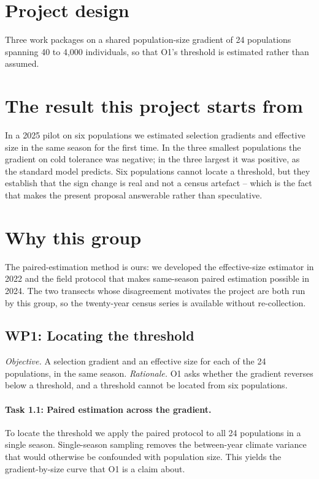 \documentclass[11pt,a4paper]{article}
\begin{document}
\maketitle
\startsectiona

\section{Project design}
Three work packages on a shared population-size gradient of 24 populations spanning
40 to 4,000 individuals, so that O1's threshold is estimated rather than assumed.

\section{The result this project starts from}
In a 2025 pilot on six populations we estimated selection gradients and effective size
in the same season for the first time. In the three smallest populations the gradient
on cold tolerance was negative; in the three largest it was positive, as the standard
model predicts. Six populations cannot locate a threshold, but they establish that the
sign change is real and not a census artefact -- which is the fact that makes the
present proposal answerable rather than speculative.

\section{Why this group}
The paired-estimation method is ours: we developed the effective-size estimator in
2022 and the field protocol that makes same-season paired estimation possible in 2024.
The two transects whose disagreement motivates the project are both run by this group,
so the twenty-year census series is available without re-collection.

\startsectionb

\subsection{WP1: Locating the threshold}
\emph{Objective.} A selection gradient and an effective size for each of the 24
populations, in the same season.
\emph{Rationale.} O1 asks whether the gradient reverses below a threshold, and a
threshold cannot be located from six populations.

\paragraph{Task 1.1: Paired estimation across the gradient.}
To locate the threshold we apply the paired protocol to all 24 populations in a single
season. Single-season sampling removes the between-year climate variance that would
otherwise be confounded with population size. This yields the gradient-by-size curve
that O1 is a claim about.
\end{document}

